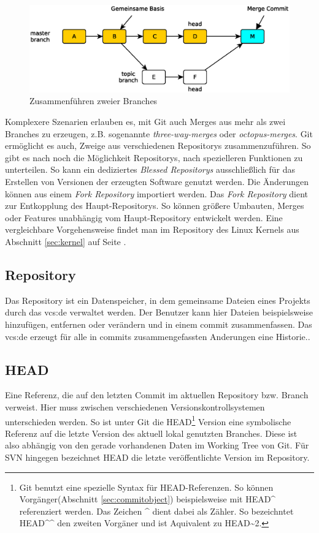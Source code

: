 \begin{figure}[hb]
  \centering
  \includegraphics[scale=0.60]{images/merge.eps}
  \caption{Zusammenführen zweier Branches}
  \label{fig:merge}
\end{figure}

Komplexere Szenarien erlauben es, mit Git auch Merges aus mehr als zwei
Branches zu erzeugen, z.B. sogenannte \textit{three-way-merges} oder
\textit{octopus-merges}\cite[S.~87]{gitosp}. Git ermöglicht es auch, Zweige aus
verschiedenen Repositorys zusammenzuführen. So gibt es nach \cite[3]{gitwf}
noch die Möglichkeit Repositorys, nach spezielleren Funktionen zu unterteilen.
So kann ein dediziertes \textit{Blessed Repositorys} ausschließlich für das
Erstellen von Versionen der erzeugten Software genutzt werden. Die Änderungen
können aus einem \textit{Fork Repository} importiert werden. Das \textit{Fork
Repository} dient zur Entkopplung des Haupt-Repositorys. So können größere
Umbauten, Merges oder Features unabhängig vom Haupt-Repository entwickelt
werden\cite[S.~123]{gitwf}. Eine vergleichbare Vorgehensweise findet man im
Repository des Linux Kernels\cite{link:linuxgit} aus Abschnitt \ref{sec:kernel}
auf Seite \pageref{sec:kernel}.

\subsection{Repository}\label{sec:repository}
Das Repository ist ein Datenspeicher, in dem gemeinsame Dateien eines Projekts
durch das \acrlong{vcs:de} verwaltet werden. Der Benutzer kann hier Dateien
beispielsweise hinzufügen, entfernen oder verändern und in einem \gls{commit}
zusammenfassen. Das \acrlong{vcs:de} erzeugt für alle in \glspl{commit}
zusammengefassten Anderungen eine Historie.\cite[S.~38]{hagen:1678}.

\subsection{HEAD}\label{sec:head}
Eine Referenz, die auf den letzten Commit im aktuellen Repository bzw. Branch
verweist. Hier muss zwischen verschiedenen Versionskontrollsystemen
unterschieden werden. So ist unter Git die HEAD\footnote{Git benutzt eine
spezielle Syntax für HEAD-Referenzen. So können Vorgänger(Abschnitt
\ref{sec:commitobject}) beispielsweise mit HEAD\^{} referenziert werden. Das
Zeichen \^{} dient dabei als Zähler. So bezeichntet HEAD\^{}\^{} den zweiten Vorgäner und
ist Aquivalent zu HEAD\~{}2.\cite[S.~65]{gitosp}} Version eine symbolische
Referenz auf die letzte Version des aktuell lokal genutzten Branches. Diese ist
also abhängig von den gerade vorhandenen Daten im Working Tree von
Git\cite[S.~20]{gitosp}. Für SVN hingegen bezeichnet HEAD die letzte
veröffentlichte Version im Repository.

